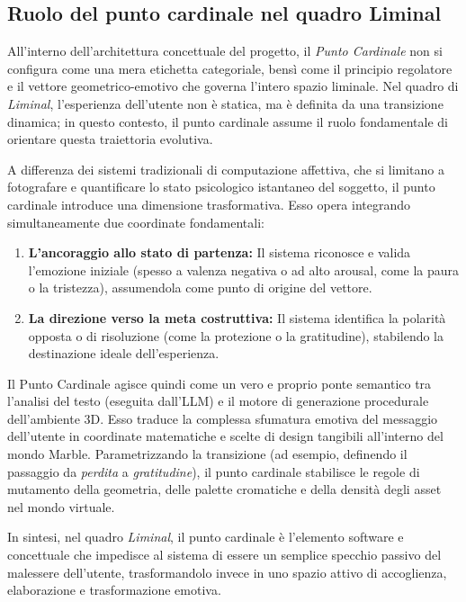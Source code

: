 \documentclass[11pt]{report}
\begin{document}
\subsection{Ruolo del punto cardinale nel quadro Liminal}

All'interno dell'architettura concettuale del progetto, il \textit{Punto Cardinale} non si configura come una mera etichetta categoriale, bensì come il principio regolatore e il vettore geometrico-emotivo che governa l'intero spazio liminale. Nel quadro di \textit{Liminal}, l'esperienza dell'utente non è statica, ma è definita da una transizione dinamica; in questo contesto, il punto cardinale assume il ruolo fondamentale di orientare questa traiettoria evolutiva.

A differenza dei sistemi tradizionali di computazione affettiva, che si limitano a fotografare e quantificare lo stato psicologico istantaneo del soggetto, il punto cardinale introduce una dimensione trasformativa. Esso opera integrando simultaneamente due coordinate fondamentali:
\begin{enumerate}
    \item \textbf{L'ancoraggio allo stato di partenza:} Il sistema riconosce e valida l'emozione iniziale (spesso a valenza negativa o ad alto arousal, come la paura o la tristezza), assumendola come punto di origine del vettore.
    \item \textbf{La direzione verso la meta costruttiva:} Il sistema identifica la polarità opposta o di risoluzione (come la protezione o la gratitudine), stabilendo la destinazione ideale dell'esperienza.
\end{enumerate}

Il Punto Cardinale agisce quindi come un vero e proprio ponte semantico tra l'analisi del testo (eseguita dall'LLM) e il motore di generazione procedurale dell'ambiente 3D. Esso traduce la complessa sfumatura emotiva del messaggio dell'utente in coordinate matematiche e scelte di design tangibili all'interno del mondo Marble. Parametrizzando la transizione (ad esempio, definendo il passaggio da \textit{perdita} a \textit{gratitudine}), il punto cardinale stabilisce le regole di mutamento della geometria, delle palette cromatiche e della densità degli asset nel mondo virtuale. 

In sintesi, nel quadro \textit{Liminal}, il punto cardinale è l'elemento software e concettuale che impedisce al sistema di essere un semplice specchio passivo del malessere dell'utente, trasformandolo invece in uno spazio attivo di accoglienza, elaborazione e trasformazione emotiva.
 
\end{document}
